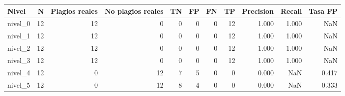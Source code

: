 \begin{tabular}{lrrrrrrrrrr}
\toprule
Nivel & N & Plagios reales & No plagios reales & TN & FP & FN & TP & Precision & Recall & Tasa FP \\
\midrule
nivel\_0 & 12 & 12 & 0 & 0 & 0 & 0 & 12 & 1.000 & 1.000 & NaN \\
nivel\_1 & 12 & 12 & 0 & 0 & 0 & 0 & 12 & 1.000 & 1.000 & NaN \\
nivel\_2 & 12 & 12 & 0 & 0 & 0 & 0 & 12 & 1.000 & 1.000 & NaN \\
nivel\_3 & 12 & 12 & 0 & 0 & 0 & 0 & 12 & 1.000 & 1.000 & NaN \\
nivel\_4 & 12 & 0 & 12 & 7 & 5 & 0 & 0 & 0.000 & NaN & 0.417 \\
nivel\_5 & 12 & 0 & 12 & 8 & 4 & 0 & 0 & 0.000 & NaN & 0.333 \\
\bottomrule
\end{tabular}
